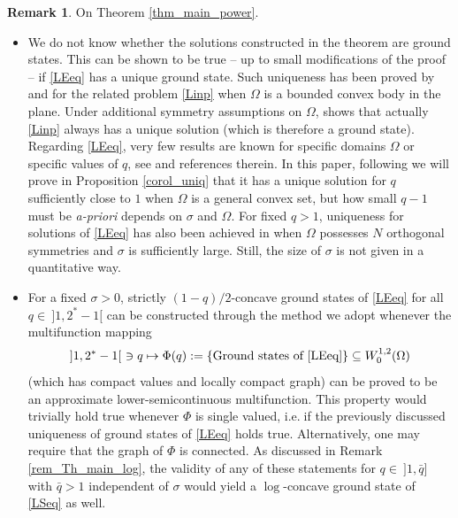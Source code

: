 \documentclass[12pt]{amsart}
\numberwithin{equation}{section}
\theoremstyle{plain}
\theoremstyle{plain}
\theoremstyle{plain}
\theoremstyle{definition}
\newtheorem{remark}[theorem]{Remark}
\begin{document}
 \begin{remark} \label{rem_th_power}
On Theorem \ref{thm_main_power}.
 \begin{itemize}[leftmargin=*]
 \item
 We do not know whether the solutions constructed in the theorem are ground states. 
This can be shown to be true -- up to small modifications of the proof -- if \eqref{LEeq} has a unique ground state. 
 Such uniqueness has been proved by \cite{Lin94} and \cite[Section 4]{BrFr20} for the related problem \eqref{Linp}
 when $\Omega$ is a bounded convex body in the plane. Under additional symmetry assumptions on $\Omega$, \cite[Theorem 4.1]{DGP99} shows that actually \eqref{Linp} always has a unique solution (which is therefore a ground state). 
 Regarding \eqref{LEeq}, very few results are known for specific domains $\Omega$ or specific values of $q$, see \cite{MPPR09} and references therein. 
In this paper, following \cite{DGP99} we will prove in Proposition \ref{corol_uniq} that it has a unique solution for $q$ sufficiently close to $1$ when $\Omega$ is a general convex set, but how small $q-1$ must be {\em a-priori} depends on $\sigma$ and $\Omega$.
For fixed $q>1$, uniqueness for solutions of \eqref{LEeq} has also been achieved in \cite{Dan95} when $\Omega$ possesses $N$ orthogonal symmetries and $\sigma$ is sufficiently large. Still, the size of $\sigma$ is not given in a quantitative way. 
\item
For a fixed $\sigma>0$, strictly $(1-q)/2$-concave ground states of \eqref{LEeq} for all $q\in\ ]1, 2^*-1[$ can be constructed through the method we adopt whenever the multifunction mapping 
 \[
 ]1, 2^*-1[\ \ni q \mapsto \Phi(q):=\{\text{Ground states of \eqref{LEeq}}\}\subseteq W^{1,2}_0(\Omega)
 \]
 (which has compact values and locally compact graph) can be proved to be an approximate lower-semicontinuous multifunction. 
This property would trivially hold true whenever $\Phi$ is single valued, i.e.$\;$if the previously discussed uniqueness of ground states of \eqref{LEeq} holds true. Alternatively, one may require that the graph of $\Phi$ is connected. 
As discussed in Remark \ref{rem_Th_main_log}, the validity of any of these statements for $q\in\ ]1, \bar q]$ with $\bar q>1$ independent of $\sigma$ would yield a $\log$-concave ground state of \eqref{LSeq} as well. 


\end{itemize}
\end{remark}
\end{document}
